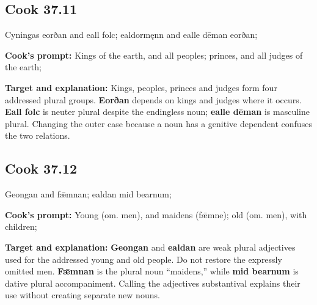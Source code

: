 \par\begin{minipage}{\linewidth}\raggedright
\subsection*{Cook 37.11}

Cyningas eorðan and eall folc; ealdormęnn and ealle dēman eorðan;

\textbf{Cook's prompt:} Kings of the earth, and all peoples; princes, and all judges of the earth;

\textbf{Target and explanation:} Kings, peoples, princes and judges form four addressed plural groups. \textbf{Eorðan} depends on kings and judges where it occurs. \textbf{Eall folc} is neuter plural despite the endingless noun; \textbf{ealle dēman} is masculine plural. Changing the outer case because a noun has a genitive dependent confuses the two relations.

\end{minipage}\par\addvspace{4pt}

\par\begin{minipage}{\linewidth}\raggedright
\subsection*{Cook 37.12}

Geongan and fǣmnan; ealdan mid bearnum;

\textbf{Cook's prompt:} Young (om. men), and maidens (fǣmne); old (om. men), with children;

\textbf{Target and explanation:} \textbf{Geongan} and \textbf{ealdan} are weak plural adjectives used for the addressed young and old people. Do not restore the expressly omitted men. \textbf{Fǣmnan} is the plural noun “maidens,” while \textbf{mid bearnum} is dative plural accompaniment. Calling the adjectives substantival explains their use without creating separate new nouns.

\end{minipage}\par\addvspace{4pt}

